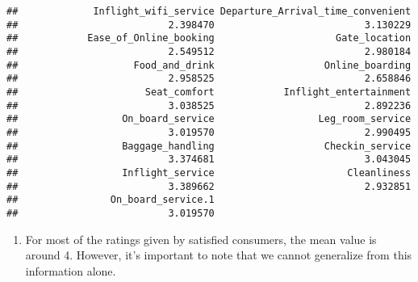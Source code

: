 \documentclass[
]{article}
\newenvironment{Shaded}{\begin{snugshade}}{\end{snugshade}}
\newcommand{\CommentTok}[1]{\textcolor[rgb]{0.56,0.35,0.01}{\textit{#1}}}
\newcommand{\DecValTok}[1]{\textcolor[rgb]{0.00,0.00,0.81}{#1}}
\newcommand{\FunctionTok}[1]{\textcolor[rgb]{0.13,0.29,0.53}{\textbf{#1}}}
\newcommand{\NormalTok}[1]{#1}
\newcommand{\OtherTok}[1]{\textcolor[rgb]{0.56,0.35,0.01}{#1}}
\newcommand{\SpecialCharTok}[1]{\textcolor[rgb]{0.81,0.36,0.00}{\textbf{#1}}}
\newcommand{\StringTok}[1]{\textcolor[rgb]{0.31,0.60,0.02}{#1}}
\providecommand{\tightlist}{%
  \setlength{\itemsep}{0pt}\setlength{\parskip}{0pt}}
\begin{document}
\begin{verbatim}
##             Inflight_wifi_service Departure_Arrival_time_convenient 
##                          2.398470                          3.130229 
##            Ease_of_Online_booking                     Gate_location 
##                          2.549512                          2.980184 
##                    Food_and_drink                   Online_boarding 
##                          2.958525                          2.658846 
##                      Seat_comfort            Inflight_entertainment 
##                          3.038525                          2.892236 
##                  On_board_service                  Leg_room_service 
##                          3.019570                          2.990495 
##                  Baggage_handling                   Checkin_service 
##                          3.374681                          3.043045 
##                  Inflight_service                       Cleanliness 
##                          3.389662                          2.932851 
##                On_board_service.1 
##                          3.019570
\end{verbatim}

\begin{enumerate}
\def\labelenumi{\arabic{enumi}.}
\setcounter{enumi}{1}
\tightlist
\item
  For most of the ratings given by satisfied consumers, the mean value
  is around 4. However, it's important to note that we cannot generalize
  from this information alone.
\end{enumerate}

\begin{Shaded}
\end{Shaded}
\end{document}
